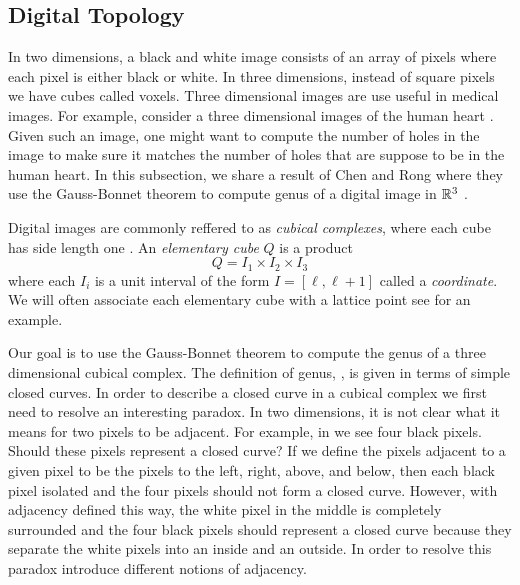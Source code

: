 \subsection{Digital Topology}
\label{sec:digital-topology}

In two dimensions, a black and white image consists of an array of pixels
where each pixel is either black or white.
In three dimensions,
instead of square pixels we have cubes called voxels.
Three dimensional images are use useful in medical images. 
For example, consider a
three dimensional images of the human heart \cite{bovik_handbook_2000}.
Given such an image, one might want to compute
the number of holes in the image to make sure it
matches the number of holes that are suppose to be in
the human heart. In this subsection, we share a result
of Chen and Rong where they 
use the Gauss-Bonnet theorem to 
compute genus of a digital image in $\mathbb{R}^3$ \cite{chen_digital_2010}.


Digital images are commonly reffered to as \emph{cubical complexes},
where each cube has side length one \cite{kong_digital_1989}.
An \emph{elementary cube} $Q$ is a product
$$Q=I_1\times I_2 \times I_3$$
where each $I_i$ is a unit interval of the form $I=[\ell,\ell+1]$
called a \emph{coordinate}.
We will often associate each elementary cube with a lattice point
see  for an example.

Our goal is to use the Gauss-Bonnet theorem to compute
the genus of a three dimensional cubical complex.
The definition of genus, , is given in terms
of simple closed curves. In order to describe a closed curve in a cubical
complex we first need to resolve an interesting paradox.
In two dimensions, it is not clear what it means
for two pixels to be adjacent. For example, in 
we see four black pixels. Should these pixels represent a closed
curve? If we define the pixels adjacent to a given pixel to be the 
pixels to the left, right, above, and below, then each black pixel isolated
and the four pixels should not form a closed curve. However,
with adjacency defined this way, the white pixel in the middle is completely surrounded 
and the four black pixels should represent a closed curve because
they separate the white pixels into an inside and an outside.
In order to resolve this paradox introduce different notions of adjacency.


